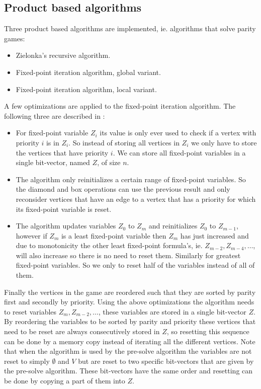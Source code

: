 \subsection{Product based algorithms}
Three product based algorithms are implemented, ie. algorithms that solve parity games:
\begin{itemize}
	\item Zielonka's recursive algorithm.
	\item Fixed-point iteration algorithm, global variant.
	\item Fixed-point iteration algorithm, local variant.
\end{itemize}
A few optimizations are applied to the fixed-point iteration algorithm. The following three are described in \cite{FPITE}:
\begin{itemize}
	\item For fixed-point variable $Z_i$ its value is only ever used to check if a vertex with priority $i$ is in $Z_i$. So instead of storing all vertices in $Z_i$ we only have to store the vertices that have priority $i$. We can store all fixed-point variables in a single bit-vector, named $Z$, of size $n$.
	\item The algorithm only reinitializes a certain range of fixed-point variables. So the diamond and box operations can use the previous result and only reconsider vertices that have an edge to a vertex that has a priority for which its fixed-point variable is reset.
	\item The algorithm updates variables $Z_0$ to $Z_m$ and reinitializes $Z_0$ to $Z_{m-1}$, however if $Z_m$ is a least fixed-point variable then $Z_m$ has just increased and due to monotonicity the other least fixed-point formula's, ie. $Z_{m-2},Z_{m-4},\dots$, will also increase so there is no need to reset them. Similarly for greatest fixed-point variables. So we only to reset half of the variables instead of all of them.
\end{itemize}
Finally the vertices in the game are reordered such that they are sorted by parity first and secondly by priority. Using the above optimizations the algorithm needs to reset variables $Z_{m}, Z_{m-2},\dots$, these variables are stored in a single bit-vector $Z$. By reordering the variables to be sorted by parity and priority these vertices that need to be reset are always consecutively stored in $Z$, so resetting this sequence can be done by a memory copy instead of iterating all the different vertices. Note that when the algorithm is used by the pre-solve algorithm the variables are not reset to simply $\emptyset$ and $V$ but are reset to two specific bit-vectors that are given by the pre-solve algorithm. These bit-vectors have the same order and resetting can be done by copying a part of them into $Z$.
